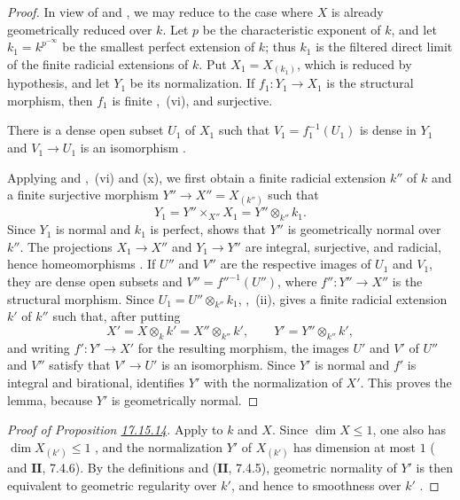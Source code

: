 \begin{proof}
In view of  and , we may reduce to the case where $X$ is already geometrically reduced over $k$.  Let $p$ be the characteristic exponent of $k$, and let $k_1=k^{p^{-\infty}}$ be the smallest perfect extension of $k$; thus $k_1$ is the filtered direct limit of the finite radicial extensions of $k$.  Put $X_1=X_{(k_1)}$, which is reduced by hypothesis, and let $Y_1$ be its normalization.  If $f_1:Y_1\to X_1$ is the structural morphism, then $f_1$ is finite ,~(vi), and surjective.

There is a dense open subset $U_1$ of $X_1$ such that $V_1=f_1^{-1}(U_1)$ is dense in $Y_1$ and $V_1\to U_1$ is an isomorphism .

Applying  and ,~(vi) and (x), we first obtain a finite radicial extension $k''$ of $k$ and a finite surjective morphism $Y''\to X''=X_{(k'')}$ such that
\[
 Y_1=Y''\times_{X''}X_1=Y''\otimes_{k''}k_1.
\]
Since $Y_1$ is normal and $k_1$ is perfect,  shows that $Y''$ is geometrically normal over $k''$.  The projections $X_1\to X''$ and $Y_1\to Y''$ are integral, surjective, and radicial, hence homeomorphisms .  If $U''$ and $V''$ are the respective images of $U_1$ and $V_1$, they are dense open subsets and $V''=f''^{-1}(U'')$, where $f'':Y''\to X''$ is the structural morphism.  Since $U_1=U''\otimes_{k''}k_1$, ,~(ii), gives a finite radicial extension $k'$ of $k''$ such that, after putting
\[
 X'=X\otimes_k k'=X''\otimes_{k''}k',\qquad
 Y'=Y''\otimes_{k''}k',
\]
and writing $f':Y'\to X'$ for the resulting morphism, the images $U'$ and $V'$ of $U''$ and $V''$ satisfy that $V'\to U'$ is an isomorphism.  Since $Y'$ is normal and $f'$ is integral and birational,  identifies $Y'$ with the normalization of $X'$.  This proves the lemma, because $Y'$ is geometrically normal.
\end{proof}

\begin{proof}[Proof of Proposition \textup{{\hyperlink{ega4.c04.prop.17-15-14}{17.15.14}}}]
Apply  to $k$ and $X$.  Since $\dim X\leq1$, one also has $\dim X_{(k')}\leq1$ , and the normalization $Y'$ of $X_{(k')}$ has dimension at most $1$ ( and $\mathbf{II}$, 7.4.6).  By the definitions and ($\mathbf{II}$, 7.4.5), geometric normality of $Y'$ is then equivalent to geometric regularity over $k'$, and hence to smoothness over $k'$ .
\end{proof}

